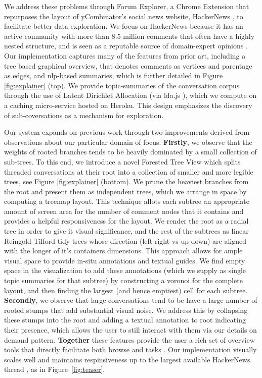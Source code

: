 \documentclass{egpubl}
\begin{document}
We address these problems through Forum Explorer, a Chrome Extension that repurposes the layout of yCombinator's social news website, HackerNews \cite{hackernews}, to facilitate better data exploration. %
%
We focus on HackerNews because it has an active community with more than 8.5 million comments that often have a highly nested structure, and is seen as a reputable source of domain-expert opinions \cite{barik2015heart}.
%
Our implementation captures many of the features from prior art, including a tree based graphical overview, that denotes comments as vertices and parentage as edges, and nlp-based summaries, which is further detailed in Figure \ref{fig:explainer} (top). 
%
We provide topic-summaries of the conversation corpus through the use of Latent Dirichlet Allocation (via lda.js \cite{lda-js}), which we compute on a caching micro-service hosted on Heroku. 
%
This design emphasizes the discovery of sub-coversations as a mechanism for exploration.




Our system expands on previous work through two improvements derived from observations about our particular domain of focus.
%
\textbf{Firstly}, we observe that the weights of rooted branches tends to be heavily dominated by a small collection of sub-trees.
%
To this end, we introduce a novel Forested Tree View which splits threaded conversations at their root into a collection of smaller and more legible trees, see Figure \ref{fig:explainer} (bottom).
%
We prune the heaviest branches from the root and present them as independent trees, which we arrange in space by computing a treemap layout.
%
This technique allots each subtree an appropriate amount of screen area for the number of comment nodes that it contains and provides a helpful responsiveness for the layout.
%
We render the root as a radial tree in order to give it visual significance, and the rest of the subtrees as linear Reingold-Tilford tidy trees whose direction (left-right vs up-down) are aligned with the longer of it's containers dimensions.
%
This approach allows for ample visual space to provide in-situ annotations and textual guides. 
%
We find empty space in the visualization to add these annotations (which we supply as single topic summaries for that subtree) by constructing a voronoi for the complete layout, and then finding the largest (and hence emptiest) cell for each subtree.
%
\textbf{Secondly}, we observe that large conversations tend to be have a large number of rooted stumps that add substantial visual noise.
%
We address this by collapsing these stumps into the root and adding a textual annotation to root indicating their presence, which allows the user to still interact with them via our details on demand pattern.
%
\textbf{Together} these features provide the user a rich set of overview tools that directly facilitate both browse and  tasks \cite{brehmer2013multi}.
%
Our implementation visually scales well and maintains respinsiveness up to the largest available HackerNews thread \cite{hackernews-biggest}, as in Figure~\ref{fig:teaser}.
\end{document}
